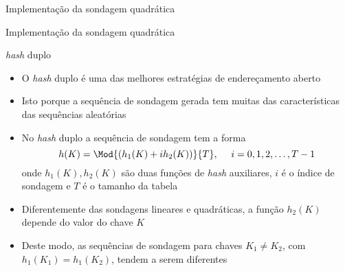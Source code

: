 

\begin{frame}[fragile]{Implementação da sondagem quadrática}
\end{frame}

\begin{frame}[fragile]{Implementação da sondagem quadrática}
\end{frame}

\begin{frame}[fragile]{\textit{hash} duplo}

    \begin{itemize}
        \item O \textit{hash} duplo é uma das melhores estratégias de endereçamento aberto

        \item Isto porque a sequência de sondagem gerada tem muitas das características das
            sequências aleatórias

        \item No \textit{hash} duplo a sequência de sondagem tem a forma
        \[
            h(K) = \Mod{(h_1(K) + ih_2(K))}{T},\ \ \ \ i=0,1,2,\ldots, T - 1
        \]
        onde $h_1(K), h_2(K)$ são duas funções de \textit{hash} auxiliares, $i$ é o índice de
        sondagem e $T$ é o tamanho da tabela

        \item Diferentemente das sondagens lineares e quadráticas, a função $h_2(K)$ depende do
            valor do chave $K$

        \item Deste modo, as sequências de sondagem para chaves $K_1\neq K_2$,
            com $h_1(K_1) = h_1(K_2)$, tendem a serem diferentes
    \end{itemize}

\end{frame}

